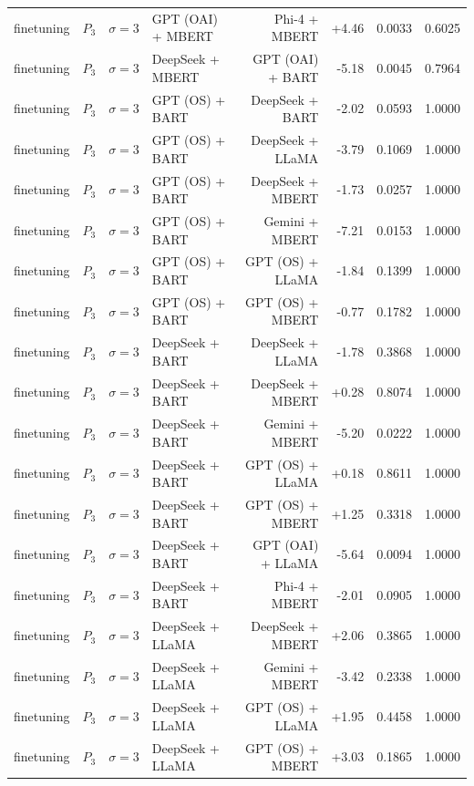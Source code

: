 \begin{table}[htbp]
\begin{tabular*}{\textwidth}{@{\extracolsep{\fill}}llllrrrl}
finetuning & $P_3$ & $\sigma{=}3$ & GPT (OAI) + MBERT & Phi-4 + MBERT & +4.46 & 0.0033 & 0.6025 \\
finetuning & $P_3$ & $\sigma{=}3$ & DeepSeek + MBERT & GPT (OAI) + BART & -5.18 & 0.0045 & 0.7964 \\
finetuning & $P_3$ & $\sigma{=}3$ & GPT (OS) + BART & DeepSeek + BART & -2.02 & 0.0593 & 1.0000 \\
finetuning & $P_3$ & $\sigma{=}3$ & GPT (OS) + BART & DeepSeek + LLaMA & -3.79 & 0.1069 & 1.0000 \\
finetuning & $P_3$ & $\sigma{=}3$ & GPT (OS) + BART & DeepSeek + MBERT & -1.73 & 0.0257 & 1.0000 \\
finetuning & $P_3$ & $\sigma{=}3$ & GPT (OS) + BART & Gemini + MBERT & -7.21 & 0.0153 & 1.0000 \\
finetuning & $P_3$ & $\sigma{=}3$ & GPT (OS) + BART & GPT (OS) + LLaMA & -1.84 & 0.1399 & 1.0000 \\
finetuning & $P_3$ & $\sigma{=}3$ & GPT (OS) + BART & GPT (OS) + MBERT & -0.77 & 0.1782 & 1.0000 \\
finetuning & $P_3$ & $\sigma{=}3$ & DeepSeek + BART & DeepSeek + LLaMA & -1.78 & 0.3868 & 1.0000 \\
finetuning & $P_3$ & $\sigma{=}3$ & DeepSeek + BART & DeepSeek + MBERT & +0.28 & 0.8074 & 1.0000 \\
finetuning & $P_3$ & $\sigma{=}3$ & DeepSeek + BART & Gemini + MBERT & -5.20 & 0.0222 & 1.0000 \\
finetuning & $P_3$ & $\sigma{=}3$ & DeepSeek + BART & GPT (OS) + LLaMA & +0.18 & 0.8611 & 1.0000 \\
finetuning & $P_3$ & $\sigma{=}3$ & DeepSeek + BART & GPT (OS) + MBERT & +1.25 & 0.3318 & 1.0000 \\
finetuning & $P_3$ & $\sigma{=}3$ & DeepSeek + BART & GPT (OAI) + LLaMA & -5.64 & 0.0094 & 1.0000 \\
finetuning & $P_3$ & $\sigma{=}3$ & DeepSeek + BART & Phi-4 + MBERT & -2.01 & 0.0905 & 1.0000 \\
finetuning & $P_3$ & $\sigma{=}3$ & DeepSeek + LLaMA & DeepSeek + MBERT & +2.06 & 0.3865 & 1.0000 \\
finetuning & $P_3$ & $\sigma{=}3$ & DeepSeek + LLaMA & Gemini + MBERT & -3.42 & 0.2338 & 1.0000 \\
finetuning & $P_3$ & $\sigma{=}3$ & DeepSeek + LLaMA & GPT (OS) + LLaMA & +1.95 & 0.4458 & 1.0000 \\
finetuning & $P_3$ & $\sigma{=}3$ & DeepSeek + LLaMA & GPT (OS) + MBERT & +3.03 & 0.1865 & 1.0000 \\

\end{tabular*}
\end{table}
